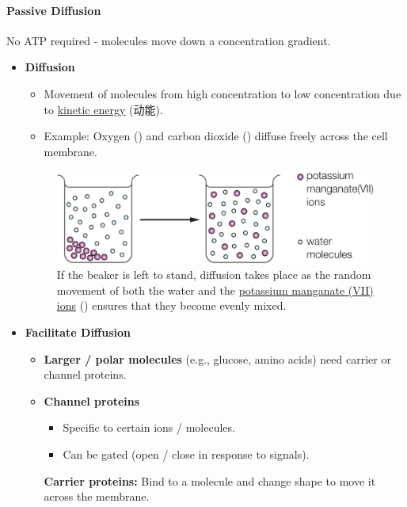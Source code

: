 \paragraph{Passive Diffusion}
No ATP required - molecules move down a concentration gradient.
\begin{itemize}
    \item \textbf{Diffusion}
    \begin{itemize}
        \item Movement of molecules from high concentration to low concentration due to \underline{kinetic energy} (动能).
        \item Example: Oxygen () and carbon dioxide () diffuse freely across the cell membrane.
    \end{itemize}
    \begin{figure}[H]
        \centering
        \includegraphics[scale=0.12]{Biology/2A/Images/2A-2-1.png}
        \caption{If the beaker is left to stand, diffusion takes place as the random movement of both the water and the
        \underline{potassium manganate (VII) ions} () ensures that they become evenly mixed.} 
    \end{figure}
    \item \textbf{Facilitate Diffusion}
    \begin{itemize}
        \item \textbf{Larger / polar molecules} (e.g., glucose, amino acids) need carrier or channel proteins.
        \item \textbf{Channel proteins}
        \begin{itemize}
            \item Specific to certain ions / molecules.
            \item Can be gated (open / close in response to signals).
        \end{itemize}
        \textbf{Carrier proteins:} Bind to a molecule and change shape to move it across the membrane.
    \end{itemize}
    \begin{figure}[H]
        \centering

\end{figure}
\end{itemize}
